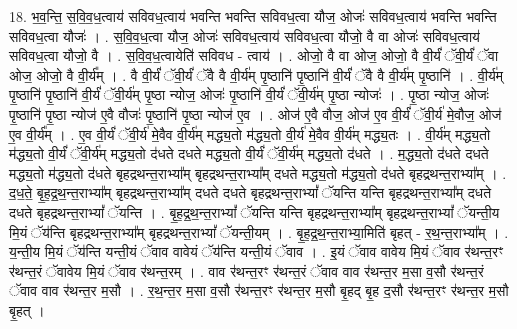 \documentclass[17pt]{extarticle}
\begin{document}
18. भ॒व॒न्ति॒ स॒वि॒व॒ध॒त्वाय॑ सविवध॒त्वाय॑ भवन्ति भवन्ति सविवध॒त्वा यौज॒ ओजः॑ सविवध॒त्वाय॑ भवन्ति भवन्ति सविवध॒त्वा यौजः॑ । . स॒वि॒व॒ध॒त्वा यौज॒ ओजः॑ सविवध॒त्वाय॑ सविवध॒त्वा यौजो॒ वै वा ओजः॑ सविवध॒त्वाय॑ सविवध॒त्वा यौजो॒ वै । . स॒वि॒व॒ध॒त्वायेति॑ सविवध - त्वाय॑ । . ओजो॒ वै वा ओज॒ ओजो॒ वै वी॒र्यं॑ ॅवी॒र्यं॑ ॅवा ओज॒ ओजो॒ वै वी॒र्य᳚म् । . वै वी॒र्यं॑ ॅवी॒र्यं॑ ॅवै वै वी॒र्य॑म् पृ॒ष्ठानि॑ पृ॒ष्ठानि॑ वी॒र्यं॑ ॅवै वै वी॒र्य॑म् पृ॒ष्ठानि॑ । . वी॒र्य॑म् पृ॒ष्ठानि॑ पृ॒ष्ठानि॑ वी॒र्यं॑ ॅवी॒र्य॑म् पृ॒ष्ठा न्योज॒ ओजः॑ पृ॒ष्ठानि॑ वी॒र्यं॑ ॅवी॒र्य॑म् पृ॒ष्ठा न्योजः॑ । . पृ॒ष्ठा न्योज॒ ओजः॑ पृ॒ष्ठानि॑ पृ॒ष्ठा न्योज॑ ए॒वै वौजः॑ पृ॒ष्ठानि॑ पृ॒ष्ठा न्योज॑ ए॒व । . ओज॑ ए॒वै वौज॒ ओज॑ ए॒व वी॒र्यं॑ ॅवी॒र्य॑ मे॒वौज॒ ओज॑ ए॒व वी॒र्य᳚म् । . ए॒व वी॒र्यं॑ ॅवी॒र्य॑ मे॒वैव वी॒र्य॑म् मद्ध्य॒तो म॑द्ध्य॒तो वी॒र्य॑ मे॒वैव वी॒र्य॑म् मद्ध्य॒तः । . वी॒र्य॑म् मद्ध्य॒तो म॑द्ध्य॒तो वी॒र्यं॑ ॅवी॒र्य॑म् मद्ध्य॒तो द॑धते दधते मद्ध्य॒तो वी॒र्यं॑ ॅवी॒र्य॑म् मद्ध्य॒तो द॑धते । . म॒द्ध्य॒तो द॑धते दधते मद्ध्य॒तो म॑द्ध्य॒तो द॑धते बृहद्रथन्त॒राभ्या᳚म् बृहद्रथन्त॒राभ्या᳚म् दधते मद्ध्य॒तो म॑द्ध्य॒तो द॑धते बृहद्रथन्त॒राभ्या᳚म् । . द॒ध॒ते॒ बृ॒ह॒द्र॒थ॒न्त॒राभ्या᳚म् बृहद्रथन्त॒राभ्या᳚म् दधते दधते बृहद्रथन्त॒राभ्यां᳚ ॅयन्ति यन्ति बृहद्रथन्त॒राभ्या᳚म् दधते दधते बृहद्रथन्त॒राभ्यां᳚ ॅयन्ति । . बृ॒ह॒द्र॒थ॒न्त॒राभ्यां᳚ ॅयन्ति यन्ति बृहद्रथन्त॒राभ्या᳚म् बृहद्रथन्त॒राभ्यां᳚ ॅयन्ती॒य मि॒यं ॅय॑न्ति बृहद्रथन्त॒राभ्या᳚म् बृहद्रथन्त॒राभ्यां᳚ ॅयन्ती॒यम् । . बृ॒ह॒द्र॒थ॒न्त॒राभ्या॒मिति॑ बृहत् - र॒थ॒न्त॒राभ्या᳚म् । . य॒न्ती॒य मि॒यं ॅय॑न्ति यन्ती॒यं ॅवाव वावेयं ॅय॑न्ति यन्ती॒यं ॅवाव । . इ॒यं ॅवाव वावेय मि॒यं ॅवाव र॑थन्त॒रꣳ र॑थन्त॒रं ॅवावेय मि॒यं ॅवाव र॑थन्त॒रम् । . वाव र॑थन्त॒रꣳ र॑थन्त॒रं ॅवाव वाव र॑थन्त॒र म॒सा व॒सौ र॑थन्त॒रं ॅवाव वाव र॑थन्त॒र म॒सौ । . र॒थ॒न्त॒र म॒सा व॒सौ र॑थन्त॒रꣳ र॑थन्त॒र म॒सौ बृ॒हद् बृ॒ह द॒सौ र॑थन्त॒रꣳ र॑थन्त॒र म॒सौ बृ॒हत् । \newline
\end{document}
